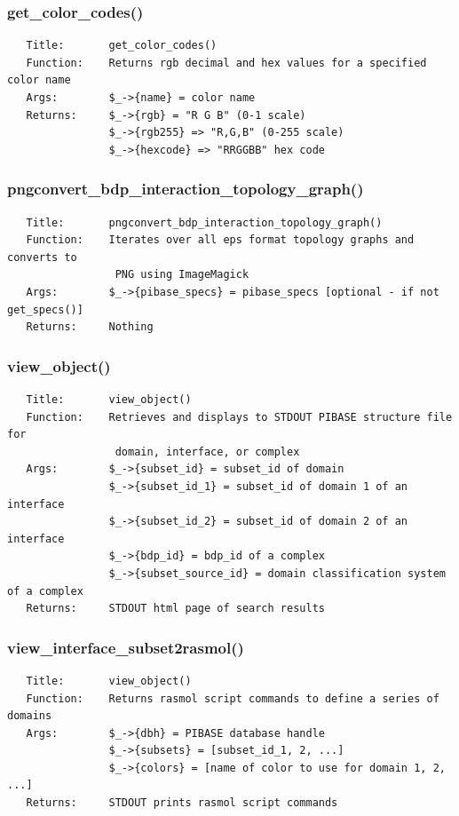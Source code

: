 \documentclass{article}
\begin{document}
\subsubsection*{get\_color\_codes()\label{pibase::web_pilig_get_color_codes_}}
\begin{verbatim}
   Title:       get_color_codes()
   Function:    Returns rgb decimal and hex values for a specified color name
   Args:        $_->{name} = color name
   Returns:     $_->{rgb} = "R G B" (0-1 scale)
                $_->{rgb255} => "R,G,B" (0-255 scale)
                $_->{hexcode} => "RRGGBB" hex code
\end{verbatim}
\subsubsection*{pngconvert\_bdp\_interaction\_topology\_graph()\label{pibase::web_pilig_pngconvert_bdp_interaction_topology_graph_}}
\begin{verbatim}
   Title:       pngconvert_bdp_interaction_topology_graph()
   Function:    Iterates over all eps format topology graphs and converts to
                 PNG using ImageMagick
   Args:        $_->{pibase_specs} = pibase_specs [optional - if not get_specs()]
   Returns:     Nothing
\end{verbatim}
\subsubsection*{view\_object()\label{pibase::web_pilig_view_object_}}
\begin{verbatim}
   Title:       view_object()
   Function:    Retrieves and displays to STDOUT PIBASE structure file for
                 domain, interface, or complex
   Args:        $_->{subset_id} = subset_id of domain
                $_->{subset_id_1} = subset_id of domain 1 of an interface
                $_->{subset_id_2} = subset_id of domain 2 of an interface
                $_->{bdp_id} = bdp_id of a complex
                $_->{subset_source_id} = domain classification system of a complex
   Returns:     STDOUT html page of search results
\end{verbatim}
\subsubsection*{view\_interface\_subset2rasmol()\label{pibase::web_pilig_view_interface_subset2rasmol_}}
\begin{verbatim}
   Title:       view_object()
   Function:    Returns rasmol script commands to define a series of domains
   Args:        $_->{dbh} = PIBASE database handle
                $_->{subsets} = [subset_id_1, 2, ...]
                $_->{colors} = [name of color to use for domain 1, 2, ...]
   Returns:     STDOUT prints rasmol script commands
\end{verbatim}
\printindex
\end{document}
